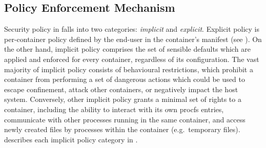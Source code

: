 \subsection{Policy Enforcement Mechanism}
\label{sub:enforcement}


Security policy in \bpfcontain{} falls into two categories: \textit{implicit} and \textit{explicit}. Explicit policy is per-container policy defined by the end-user in the container's manifest (see ). On the other hand, implicit policy comprises the set of sensible defaults which are applied and enforced for every container, regardless of its configuration. The vast majority of implicit \bpfcontain{} policy consists of behavioural restrictions, which prohibit a container from performing a set of dangerous actions which could be used to escape confinement, attack other containers, or negatively impact the host system. Conversely, other implicit policy grants a minimal set of rights to a container, including the ability to interact with its own procfs entries, communicate with other processes running in the same container, and access newly created files by processes within the container (e.g.~temporary files).  describes each implicit policy category in \bpfcontain{}.

